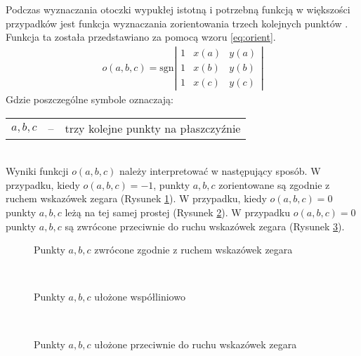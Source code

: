 Podczas wyznaczania otoczki wypukłej istotną i potrzebną funkcją w większości przypadków jest funkcja wyznaczania zorientowania trzech kolejnych punktów \cite{convexhullsimplepolygon, orient}.        Funkcja ta została przedstawiano za pomocą wzoru \ref{eq:orient}.\\
\begin{align}\label{eq:orient}
o\left(a,b, c\right) = \mathrm{sgn} \left|
\begin{matrix}
1 & x\left(a\right) & y\left(a\right)\\
1 & x\left(b\right) & y\left(b\right)\\
1 & x\left(c\right) & y\left(c\right)
\end{matrix}
\right|
\end{align}
Gdzie poszczególne symbole oznaczają:\\
    	\begin{tabular}{rcl}
    	$a, b, c$ & -- & trzy kolejne punkty na płaszczyźnie
    	\end{tabular}\\
Wyniki funkcji $o\left(a,b, c\right)$ należy interpretować w następujący sposób. W przypadku, kiedy $o\left(a,b, c\right) = -1$, punkty $a,b,c$ zorientowane są zgodnie z ruchem wskazówek zegara (Rysunek \ref{fig:clockwise}). W przypadku, kiedy $o\left(a,b, c\right) = 0$ punkty $a,b,c$ leżą na tej samej prostej (Rysunek \ref{fig:colinear}). W przypadku $o\left(a,b, c\right) = 0$ punkty $a,b,c$ są zwrócone przeciwnie do ruchu wskazówek zegara (Rysunek \ref{fig:counterclockwise}).
        \begin{figure}[h!]
        	\begin{center}
    			
    			\caption{Punkty $a, b, c$ zwrócone zgodnie z ruchem wskazówek zegara}						\label{fig:clockwise}	
    		\end{center}
    	\mysource
    	\end{figure}\vspace{-8 mm}\\
    	        \begin{figure}[h!]
        	\begin{center}
    			
    			\caption{Punkty $a, b, c$ ułożone współliniowo}						\label{fig:colinear}	
    		\end{center}
    	\mysource
    	\end{figure}\vspace{-8 mm}\\
    	 \begin{figure}[h!]
        	\begin{center}
    			
    			\caption{Punkty $a, b, c$ ułożone przeciwnie do ruchu wskazówek zegara}						\label{fig:counterclockwise}	
    		\end{center}
    	\mysource
    	\end{figure}\vspace{-8 mm}\\
